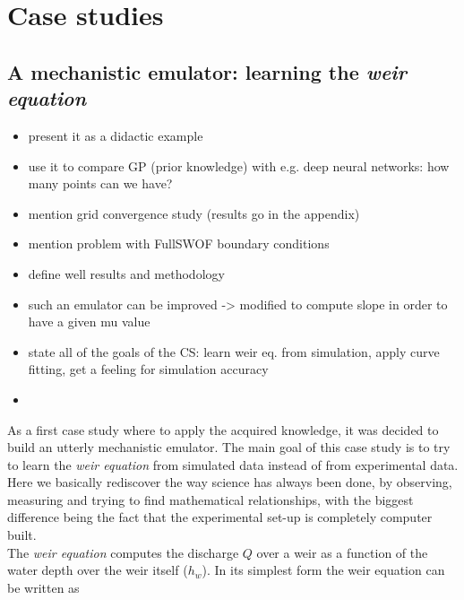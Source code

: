 \chapter{Case studies}
\label{chp:case_studies}


\section{A mechanistic emulator: learning the \emph{weir equation}}

\begin{itemize}
\itemsep0em
  \item present it as a didactic example
  \item use it to compare GP (prior knowledge) with e.g. deep neural networks: how many points can we have?
  \item mention grid convergence study (results go in the appendix)
  \item mention problem with FullSWOF boundary conditions
  \item define well results and methodology
  \item such an emulator can be improved -> modified to compute slope in order to have a given mu value
  \item state all of the goals of the CS: learn weir eq. from simulation, apply curve fitting, get a feeling for simulation accuracy
  \item 
\end{itemize}

As a first case study where to apply the acquired knowledge, it was decided to build an utterly mechanistic emulator.
The main goal of this case study is to try to learn the \emph{weir equation} from simulated data instead of from experimental data.
Here we basically rediscover the way science has always been done, by observing, measuring and trying to find mathematical relationships, with the biggest difference being the fact that the experimental set-up is completely computer built.\\

The \emph{weir equation} computes the discharge $Q$ over a weir as a function of the water depth over the weir itself ($h_w$).
In its simplest form the weir equation can be written as

